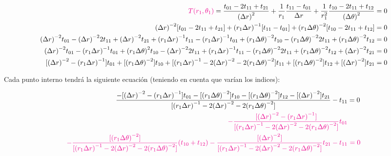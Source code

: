 \documentclass{article}
\begin{document}
\

\begin{align*}
    \textcolor{magenta}{T(r_1,\theta_1)} = 
    \frac{t_{01} - 2t_{11} + t_{21}}{{(\Delta r)}^{2}} + 
    \frac{1}{r_1}\frac{t_{11} - t_{01}}{\Delta r} + 
    \frac{1}{r_{1}^{2}}\frac{t_{10} - 2t_{11} + t_{12}}{{(\Delta\theta)}^2} &= 0 \\
    {(\Delta r)}^{-2}[t_{01} - 2t_{11} + t_{21}] + 
    {(r_1\Delta r)}^{-1}[t_{11} - t_{01}] + 
    {(r_{1}\Delta \theta)}^{-2}[t_{10} - 2t_{11} + t_{12}] &= 0 \\
    {(\Delta r)}^{-2}t_{01} - {(\Delta r)}^{-2}2t_{11} + {(\Delta r)}^{-2}t_{21} + 
    {(r_1\Delta r)}^{-1}t_{11} - {(r_1\Delta r)}^{-1}t_{01} + 
    {(r_{1}\Delta \theta)}^{-2}t_{10} - {(r_{1}\Delta \theta)}^{-2}2t_{11} + {(r_{1}\Delta \theta)}^{-2}t_{12} &= 0 \\
    {(\Delta r)}^{-2}t_{01} - {(r_1\Delta r)}^{-1}t_{01} + {(r_{1}\Delta \theta)}^{2}t_{10} 
    - {(\Delta r)}^{-2}2t_{11} + {(r_1\Delta r)}^{-1}t_{11} - {(r_{1}\Delta \theta)}^{-2}2t_{11} 
    + {(r_{1}\Delta \theta)}^{-2}t_{12} + {(\Delta r)}^{-2}t_{21} &= 0 \\
    [{(\Delta r)}^{-2} - {(r_1\Delta r)}^{-1}]t_{01} + [{(r_{1}\Delta \theta)}^{-2}]t_{10} 
    + [{(r_1\Delta r)}^{-1} - 2{(\Delta r)}^{-2} - 2{(r_{1}\Delta \theta)}^{-2}]t_{11} 
    + [{(r_{1}\Delta \theta)}^{-2}]t_{12} + [{(\Delta r)}^{-2}]t_{21} &= 0 \\
\end{align*}

\noindent Cada punto interno tendrá la siguiente ecuación (teniendo en cuenta que varían los indices):

\begin{align*}
    \frac{-[{(\Delta r)}^{-2} - {(r_1\Delta r)}^{-1}]t_{01} - [{(r_{1}\Delta \theta)}^{-2}]t_{10} 
    - [{(r_{1}\Delta \theta)}^{-2}]t_{12} - [{(\Delta r)}^{-2}]t_{21}}
    {[{(r_1\Delta r)}^{-1} - 2{(\Delta r)}^{-2} - 2{(r_{1}\Delta \theta)}^{-2}]} - t_{11} &= 0 \\
    \textcolor{magenta}{
    -\frac{[{(\Delta r)}^{-2} - {(r_1\Delta r)}^{-1}]}{[{(r_1\Delta r)}^{-1} - 2{(\Delta r)}^{-2} - 2{(r_{1}\Delta \theta)}^{-2}]}t_{01}}
    & \\
    \textcolor{magenta}{
    -\frac{[{(r_{1}\Delta \theta)}^{-2}]}{[{(r_1\Delta r)}^{-1} - 2{(\Delta r)}^{-2} - 2{(r_{1}\Delta \theta)}^{-2}]}(t_{10} + t_{12})
    -\frac{[{(\Delta r)}^{-2}]}{[{(r_1\Delta r)}^{-1} - 2{(\Delta r)}^{-2} - 2{(r_{1}\Delta \theta)}^{-2}]}t_{21} - t_{11}} &~\textcolor{magenta}{= 0}
\end{align*}
\end{document}
